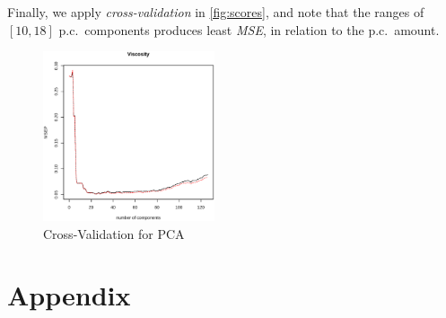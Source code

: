 \documentclass[a4paper, twocolumn]{article}
\begin{document}
        Finally, we apply \emph{cross-validation} in \cref{fig:scores}, and note that the ranges of \([10, 18]\) p.c.\ components produces least \emph{MSE}, in relation to the p.c.\ amount.

        \begin{figure}[h!]
            \centering
            \caption{Cross-Validation for PCA}
            \label{fig:pcacv}
            \includegraphics[width=0.45\textwidth]{share/pcacv.eps}
        \end{figure}

    \nocite{*}
    
    

    \onecolumn \appendix
    \section*{Appendix}

    
    
\end{document}

